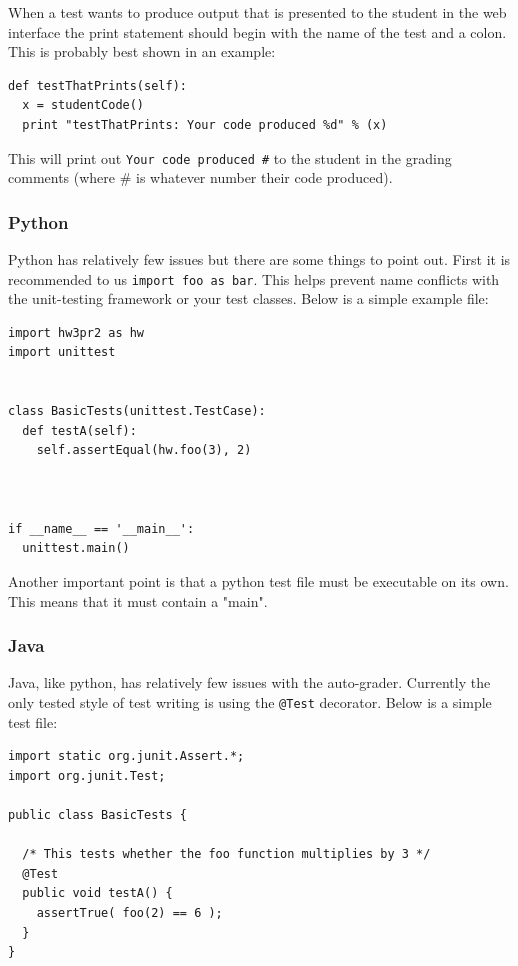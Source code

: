 \documentclass[11pt]{report}
\begin{document}
When a test wants to produce output that is presented to the student in the web interface the print
statement should begin with the name of the test and a colon. This is probably best shown in an example:

\begin{verbatim}
def testThatPrints(self):
  x = studentCode()
  print "testThatPrints: Your code produced %d" % (x) 
\end{verbatim}

This will print out \texttt{Your code produced \#} to the student in the grading comments
(where \# is whatever number their code produced). 

\pagebreak
\subsubsection{Python}
Python has relatively few issues but there are some things to point out. First it is recommended to us 
\texttt{import foo as bar}. This helps prevent name conflicts with the unit-testing framework or your 
test classes. Below is a simple example file:

\begin{verbatim}
import hw3pr2 as hw
import unittest


class BasicTests(unittest.TestCase):
  def testA(self):
    self.assertEqual(hw.foo(3), 2)
    


if __name__ == '__main__':
  unittest.main()
\end{verbatim}

Another important point is that a python test file must be executable on its own. 
This means that it must contain a "main". 

\pagebreak
\subsubsection{Java}
Java, like python, has relatively few issues with the auto-grader. Currently the only tested style of
test writing is using the \texttt{@Test} decorator. Below is a simple test file:

\begin{verbatim}
import static org.junit.Assert.*;
import org.junit.Test;

public class BasicTests {

  /* This tests whether the foo function multiplies by 3 */
  @Test
  public void testA() {
    assertTrue( foo(2) == 6 );
  }
}
\end{verbatim}
\end{document}
